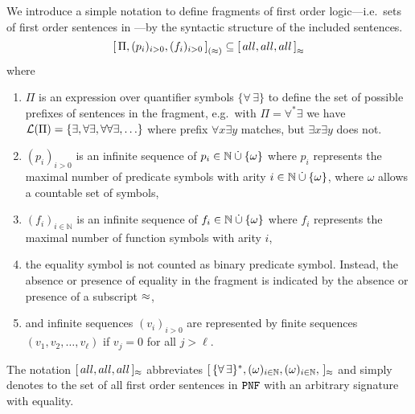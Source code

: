 \begin{definition}\label{def:prefix:class}
	We introduce a simple notation to define fragments 
	of first order logic---i.e.~sets of first order sentences in \PNF{}---by 
	the syntactic structure of the included sentences.
	\[
		{[ \, \Pi, (p_i)_{i>0}, (f_i)_{i>0} \, ]}_{(\approx)}
		\subseteq {[\, all, all, all\,]}_{\approx}
	\]
	where 
	\begin{enumerate}
		\item \( \Pi \) is an expression over quantifier symbols 
		\( \{ \forall\,\exists \} \) 
		to define the set of possible prefixes of sentences in the fragment, 
		e.g.~with \( \Pi = \forall^*\exists \) we have 
		\( \mathcal{L}(\Pi) = \{ \exists, \forall \exists, \forall\forall\exists, \ldots \} \)
		where prefix \( \forall x \exists y \) matches,
		but \( \exists x \exists y \) does not.
	\item \( (p_i)_{i>0} \) is an infinite sequence of 
	\( p_i \in \mathbb{N}\mathbin{\dot\cup}\{ \omega \} \) where 
	\( p_i \) represents the maximal number of predicate symbols 
	with arity \( i \in \mathbb{N}\mathbin{\dot\cup}\{ \omega \} \),
	where \( \omega \) allows a countable set of symbols,
	\item \( (f_i)_{i\in\mathbb{N}} \) is an infinite sequence of 
	\( f_i \in \mathbb{N}\mathbin{\dot\cup}\{ \omega \} \) where
	\( f_i \) represents the maximal number of function symbols with arity \( i \),
	\item the equality symbol is not counted as binary predicate symbol. 
	Instead, the absence or presence of equality in the fragment
	is indicated by the absence or presence of a subscript \( \approx \),
% 
	\item and infinite sequences \( (v_i)_{i>0} \) are represented by
	finite sequences \( (v_1,v_2,\ldots,v_\ell) \) if
	\( v_j = 0 \) for all \( j > \ell \).
\end{enumerate}
\begin{remark}
	The notation \( [\,all,all,all\,]_{\approx} \) abbreviates
	\( [\,
		\{\forall\,\exists\}^{*}, 
		(\omega)_{i\in\mathbb{N}},
		(\omega)_{i\in\mathbb{N}},	  
	\,]_{\approx} \) 
	and simply denotes to the set of all first order sentences in \( \texttt{PNF} \)
	with an arbitrary signature with equality. 
\end{remark}
\end{definition}


